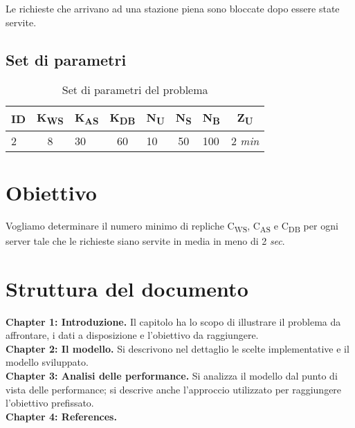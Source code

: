 \documentclass[../main.tex]{subfiles}
\begin{document}
    Le richieste che arrivano ad una stazione piena sono bloccate dopo essere state servite.

    \subsection{Set di parametri}\label{subsec:set-di-parametri}
    \begin{table}[h]
        \centering
        \begin{tabular}{|l|c|l|c|l|c|l|c|}
            \hline
            \textbf{ID} & \textbf{K\textsubscript{WS}} & \textbf{K\textsubscript{AS}} & \textbf{K\textsubscript{DB}}
            & \textbf{N\textsubscript{U}}
            & \textbf{N\textsubscript{S}}
            & \textbf{N\textsubscript{B}}
            & \textbf{Z\textsubscript{U}}\\ [0.5ex]
            \hline
            2           & 8                            & 30                           & 60                           & 10                          & 50                          & 100                         & 2 \textit{min}              \\
            \hline
        \end{tabular}
        \caption{Set di parametri del problema}
        \label{tab:set di parametri}
    \end{table}


    \section{Obiettivo}\label{sec:Obiettivo}
    Vogliamo determinare il numero minimo di repliche C\textsubscript{WS}, C\textsubscript{AS} e C\textsubscript{DB} per ogni server tale che le richieste siano servite in media in meno di 2 \textit{sec}.
    
    \section{Struttura del documento}\label{sec:struttura-del-documento}
    \textbf{Chapter 1: Introduzione.}
    Il capitolo ha lo scopo di illustrare il problema da affrontare, i dati a disposizione e l'obiettivo da raggiungere.
    \\
    \textbf{Chapter 2: Il modello.}
    Si descrivono nel dettaglio le scelte implementative e il modello sviluppato.
    \\
    \textbf{Chapter 3: Analisi delle performance.}
    Si analizza il modello dal punto di vista delle performance; si descrive anche l'approccio utilizzato per raggiungere l'obiettivo prefissato.
    \\
    \textbf{Chapter 4: References.}
\end{document}
